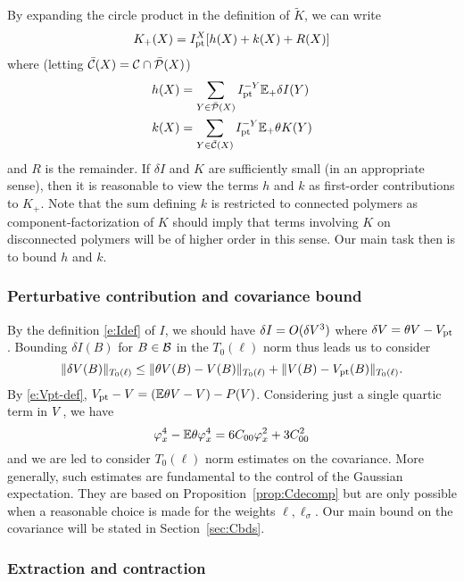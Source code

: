 By expanding the circle product in the definition of $\tilde K$, we can write
\begin{equation}
K_+(X) = I_{\rm pt}^X [h(X) + k(X) + R(X)]
\end{equation}
where (letting $\bar{\mathcal{C}}(X) = \mathcal{C}\cap\bar{\mathcal{P}}(X)$)
\begin{align}
h(X)	&= \sum_{Y\in\bar{\mathcal{P}}(X)} I_{\rm pt}^{-Y} \mathbb{E}_+ \delta I(Y) \\
k(X)	&= \sum_{Y\in\bar{\mathcal{C}}(X)} I_{\rm pt}^{-Y} \mathbb{E}_+ \theta K(Y)
\end{align}
and $R$ is the remainder. If $\delta I$ and $K$ are sufficiently small (in an
appropriate sense), then it is reasonable to view the terms $h$ and $k$ as
first-order contributions to $K_+$. Note that the sum defining $k$ is restricted
to connected polymers as component-factorization of $K$ should imply that terms
involving $K$ on disconnected polymers will be of higher order in this sense.
Our main task then is to bound $h$ and $k$.

\subsubsection{Perturbative contribution and covariance bound}

By the definition \eqref{e:Idef} of $I$, we should have $\delta I = O(\delta V^3)$
where $\delta V = \theta V - V_{\rm pt}$. Bounding $\delta I(B)$ for $B\in\mathcal{B}$
in the $T_0(\ell)$ norm thus leads us to consider
\begin{equation}
\|\delta V(B)\|_{T_0(\ell)}
	\le
\|\theta V(B) - V(B)\|_{T_0(\ell)} + \|V(B) - V_{\rm pt}(B)\|_{T_0(\ell)}.
\end{equation}
By \eqref{e:Vpt-def}, $V_{\rm pt} - V = (\mathbb{E} \theta V - V) - P(V)$.
Considering just a single quartic term in $V$, we have
\begin{equation}
\varphi_x^4 - \mathbb{E} \theta\varphi_x^4
	=
6 C_{00} \varphi_x^2 + 3 C_{00}^2
\end{equation}
and we are led to consider $T_0(\ell)$ norm estimates on the covariance. More generally,
such estimates are fundamental to the control of the Gaussian expectation. They
are based on Proposition~\ref{prop:Cdecomp} but are only possible when a reasonable
choice is made for the weights $\ell, \ell_\sigma$. Our main bound on the covariance
will be stated in Section~\ref{sec:Cbds}.

\subsubsection{Extraction and contraction}


